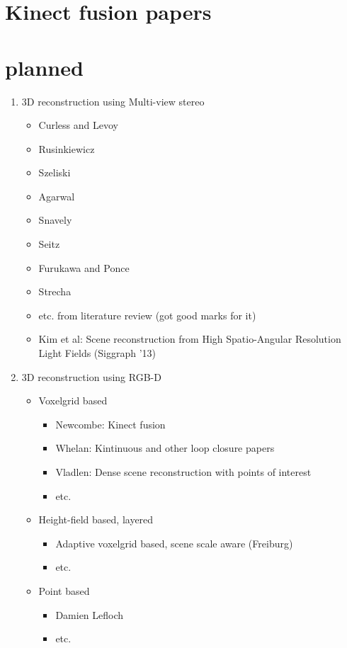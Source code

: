 \documentclass{ucl_thesis}
\begin{document}
\section{Kinect fusion papers}
\citep{Chen:2013:Scalable_volumetric}
\section{planned}

	\begin{enumerate}
		\item 3D reconstruction using Multi-view stereo
		\begin{itemize}
			\item Curless and Levoy
			\item Rusinkiewicz
			\item Szeliski
			\item Agarwal
			\item Snavely
			\item Seitz
			\item Furukawa and Ponce
			\item Strecha
			\item etc. from literature review (got good marks for it)
			\item Kim et al: Scene reconstruction from High Spatio-Angular Resolution Light Fields (Siggraph '13)
		\end{itemize}

		\item 3D reconstruction using RGB-D
		\begin{itemize}
			\item Voxelgrid based
			\begin{itemize}
				\item Newcombe: Kinect fusion
				\item Whelan: Kintinuous and other loop closure papers
				\item Vladlen: Dense scene reconstruction with points of interest
				\item etc.
			\end{itemize}

			\item Height-field based, layered
			\begin{itemize}
				\item Adaptive voxelgrid based, scene scale aware (Freiburg)
				\item etc.
			\end{itemize}

			\item Point based
			\begin{itemize}
				\item Damien Lefloch
				\item etc.
			\end{itemize}


\end{itemize}
\end{enumerate}
\end{document}
